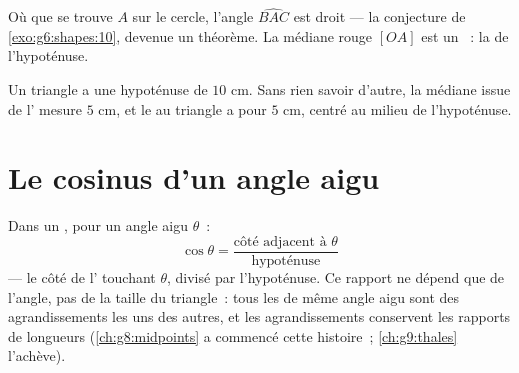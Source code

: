 \begin{omfigure}

{\small Où que se trouve $A$ sur le cercle, l'angle $\widehat{BAC}$
est droit --- la conjecture de \cref{exo:g6:shapes:10}, devenue un
théorème. La médiane rouge $[OA]$ est un ~: la  de
l'hypoténuse.}
\end{omfigure}

\begin{example}\label{ex:g8:cosine:circle}
Un triangle a une hypoténuse de $10$ cm. Sans rien savoir d'autre, la
médiane issue de l' mesure $5$ cm, et le  au triangle a pour  $5$ cm, centré au milieu de
l'hypoténuse.
\end{example}

\section{Le cosinus d'un angle aigu}

\begin{definition}[Cosinus]\label{def:g8:cosine:def}
Dans un , pour un angle aigu $\theta$~:
\[
\cos\theta = \frac{\text{côté adjacent à } \theta}{\text{hypoténuse}}
\]
--- le côté de l' touchant $\theta$, divisé par
l'hypoténuse. Ce rapport ne dépend que de l'angle, pas de la taille
du triangle~: tous les  de même angle aigu sont
des agrandissements les uns des autres, et les agrandissements
conservent les rapports de longueurs (\cref{ch:g8:midpoints} a
commencé cette histoire~; \cref{ch:g9:thales} l'achève).
\end{definition}

